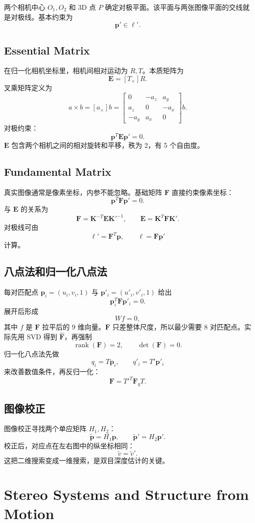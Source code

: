 \documentclass[11pt]{article}
\newcommand{\K}{\mathbf{K}}
\newcommand{\E}{\mathbf{E}}
\newcommand{\F}{\mathbf{F}}
\newcommand{\p}{\mathbf{p}}
\begin{document}
两个相机中心 $O_1,O_2$ 和 3D 点 $P$ 确定对极平面。该平面与两张图像平面的交线就是对极线。基本约束为
\[
  \p' \in \ell'.
\]

\subsection{Essential Matrix}

在归一化相机坐标里，相机间相对运动为 $R,T$。本质矩阵为
\[
  \E = [T_\times]R.
\]
叉乘矩阵定义为
\[
  a\times b =
  [a_\times]b =
  \begin{bmatrix}
    0&-a_z&a_y\\
    a_z&0&-a_x\\
    -a_y&a_x&0
  \end{bmatrix}
  b.
\]
对极约束：
\[
  \p^T\E\p'=0.
\]
$\E$ 包含两个相机之间的相对旋转和平移，秩为 2，有 5 个自由度。

\subsection{Fundamental Matrix}

真实图像通常是像素坐标，内参不能忽略。基础矩阵 $\F$ 直接约束像素坐标：
\[
  \p^T\F\p'=0.
\]
与 $\E$ 的关系为
\[
  \F = \K^{-T}\E{\K'}^{-1},\qquad
  \E = \K^T\F\K'.
\]
对极线可由
\[
  \ell'=\F^T\p,\qquad \ell=\F\p'
\]
计算。

\subsection{八点法和归一化八点法}

每对匹配点 $\p_i=(u_i,v_i,1)$ 与 $\p'_i=(u'_i,v'_i,1)$ 给出
\[
  \p_i^T\F\p'_i=0.
\]
展开后形成
\[
  Wf=0,
\]
其中 $f$ 是 $\F$ 拉平后的 9 维向量。$\F$ 只差整体尺度，所以最少需要 8 对匹配点。实际先用 SVD 得到 $\hat{\F}$，再强制
\[
  \operatorname{rank}(\F)=2,\qquad \det(\F)=0.
\]
归一化八点法先做
\[
  q_i=T\p_i,\qquad q'_i=T'\p'_i
\]
来改善数值条件，再反归一化：
\[
  \F={T'}^T\F_qT.
\]

\subsection{图像校正}

图像校正寻找两个单应矩阵 $H_1,H_2$：
\[
  \tilde{\p}=H_1\p,\qquad \tilde{\p}'=H_2\p'.
\]
校正后，对应点在左右图中的纵坐标相同：
\[
  \tilde v=\tilde v'.
\]
这把二维搜索变成一维搜索，是双目深度估计的关键。

\section{Stereo Systems and Structure from Motion}
\end{document}
